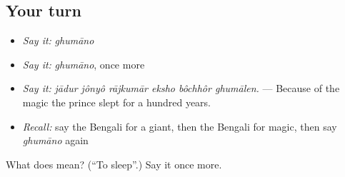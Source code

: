 \subsection*{Your turn}
\begin{itemize}
\raggedright
  \item \emph{Say it:} \emph{ghumāno}
  \item \emph{Say it:} \emph{ghumāno}, once more
  \item \emph{Say it:} \emph{jādur jônyô rājkumār eksho bôchhôr ghumālen.} — Because of the magic the prince slept for a hundred years.
  \item \emph{Recall:} say the Bengali for a giant, then the Bengali for magic, then say \emph{ghumāno} again
\end{itemize}

\begin{tcolorbox}[breakable,colback=teal!4,colframe=teal!35!black,title={Before you move on}]
What does  mean? (\textquotedblleft{}To sleep\textquotedblright{}.) Say it once more.
\end{tcolorbox}
